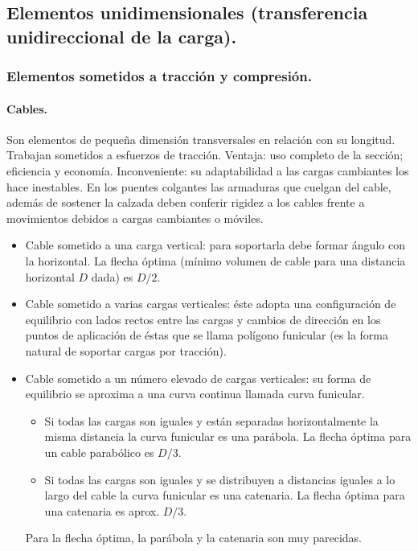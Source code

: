 \subsection{Elementos unidimensionales (transferencia unidireccional de la carga).}
\subsubsection{Elementos sometidos a tracción y compresión.}
\paragraph{Cables.}
Son elementos de pequeña dimensión transversales en relación con su longitud. Trabajan sometidos a esfuerzos de tracción. Ventaja: uso completo de la sección; eficiencia y economía. Inconveniente: su adaptabilidad a las cargas cambiantes los hace inestables. En los puentes colgantes las armaduras que cuelgan del cable, además de sostener la calzada deben conferir rigidez a los cables frente a movimientos debidos a cargas cambiantes o móviles.

\begin{itemize}
    \item Cable sometido a una carga vertical: para soportarla debe formar ángulo con la horizontal. La flecha óptima (mínimo volumen de cable para una distancia horizontal $D$ dada) es $D/2$.
    \item Cable sometido a varias cargas verticales: éste adopta una configuración de equilibrio con lados rectos entre las cargas y cambios de dirección en los puntos de aplicación de éstas que se llama polígono funicular (es la forma natural de soportar cargas por tracción).
    \item Cable sometido a un número elevado de cargas verticales: su forma de equilibrio se aproxima a una curva continua llamada curva funicular.
    \begin{itemize}
        \item Si todas las cargas son iguales y están separadas horizontalmente la misma distancia la curva funicular es una parábola. La flecha óptima para un cable parabólico es $D/3$.
        \item Si todas las cargas son iguales y se distribuyen a distancias iguales a lo largo del cable la curva funicular es una catenaria. La flecha óptima para una catenaria es aprox. $D/3$.
    \end{itemize}
    Para la flecha óptima, la parábola y la catenaria son muy parecidas.
\end{itemize}

